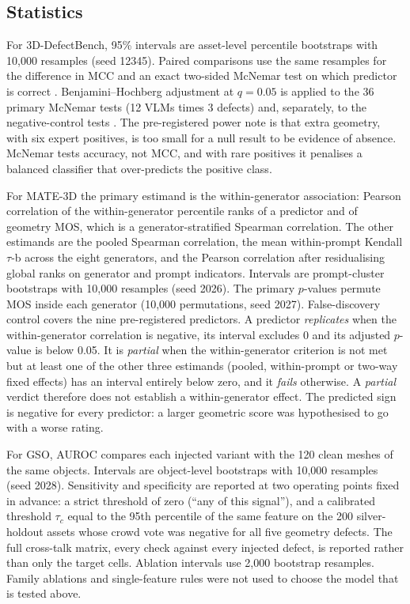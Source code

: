 \subsection{Statistics}
For 3D-DefectBench, 95\% intervals are asset-level percentile bootstraps with 10{,}000 resamples (seed 12345).
Paired comparisons use the same resamples for the difference in MCC and an exact two-sided McNemar test on which predictor is correct \citep{mcnemar1947,efron1993bootstrap}.
Benjamini--Hochberg adjustment at \(q = 0.05\) is applied to the 36 primary McNemar tests (12 VLMs times 3 defects) and, separately, to the negative-control tests \citep{benjamini1995fdr}.
The pre-registered power note is that extra geometry, with six expert positives, is too small for a null result to be evidence of absence.
McNemar tests accuracy, not MCC, and with rare positives it penalises a balanced classifier that over-predicts the positive class.

For MATE-3D the primary estimand is the within-generator association: Pearson correlation of the within-generator percentile ranks of a predictor and of geometry MOS, which is a generator-stratified Spearman correlation.
The other estimands are the pooled Spearman correlation, the mean within-prompt Kendall \(\tau\)-b across the eight generators, and the Pearson correlation after residualising global ranks on generator and prompt indicators.
Intervals are prompt-cluster bootstraps with 10{,}000 resamples (seed 2026).
The primary \(p\)-values permute MOS inside each generator (10{,}000 permutations, seed 2027).
False-discovery control covers the nine pre-registered predictors.
A predictor \emph{replicates} when the within-generator correlation is negative, its interval excludes 0 and its adjusted \(p\)-value is below 0.05.
It is \emph{partial} when the within-generator criterion is not met but at least one of the other three estimands (pooled, within-prompt or two-way fixed effects) has an interval entirely below zero, and it \emph{fails} otherwise. A \emph{partial} verdict therefore does not establish a within-generator effect.
The predicted sign is negative for every predictor: a larger geometric score was hypothesised to go with a worse rating.

For GSO, AUROC compares each injected variant with the 120 clean meshes of the same objects.
Intervals are object-level bootstraps with 10{,}000 resamples (seed 2028).
Sensitivity and specificity are reported at two operating points fixed in advance: a strict threshold of zero (``any of this signal''), and a calibrated threshold \(\tau_c\) equal to the 95th percentile of the same feature on the 200 silver-holdout assets whose crowd vote was negative for all five geometry defects.
The full cross-talk matrix, every check against every injected defect, is reported rather than only the target cells.
Ablation intervals use 2{,}000 bootstrap resamples.
Family ablations and single-feature rules were not used to choose the model that is tested above.

